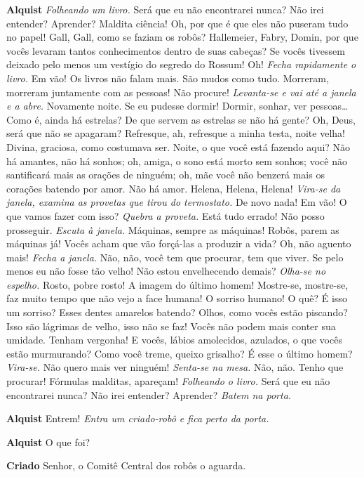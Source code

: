 \textbf{Alquist} \emph{Folheando um livro.} Será que eu não encontrarei nunca? Não irei entender?
Aprender? Maldita ciência! Oh, por que é que eles não puseram tudo no papel! 
Gall, Gall, como se faziam os robôs? Hallemeier, Fabry, Domin, por que
vocês levaram tantos conhecimentos dentro de suas cabeças? Se vocês tivessem
deixado pelo menos um vestígio do segredo do Rossum! Oh! \emph{Fecha
rapidamente o livro.} Em vão! Os livros não falam mais. São mudos como tudo.
Morreram, morreram juntamente com as pessoas! Não procure! \emph{Levanta-se e
vai até a janela e a abre.} Novamente noite. Se eu pudesse dormir! Dormir,
sonhar, ver pessoas\ldots{} Como é, ainda há estrelas? De que servem as estrelas se
não há gente? Oh, Deus, será que não se apagaram? Refresque, ah, refresque a
minha testa, noite velha! Divina, graciosa, como costumava ser. Noite, o que
você está fazendo aqui? Não há amantes, não há sonhos; oh, amiga, o sono está
morto sem sonhos; você não santificará mais as orações de ninguém; oh, mãe você
não benzerá mais os corações batendo por amor. Não há amor. Helena, Helena,
Helena! \emph{Vira-se da janela, examina as provetas que tirou do termostato.} 
De novo nada! Em vão! O que vamos fazer com isso?
\emph{Quebra a proveta.} Está tudo errado! Não posso prosseguir. 
\emph{Escuta à janela.} Máquinas, sempre as máquinas! Robôs, parem as máquinas já!
Vocês acham que vão forçá-las a produzir a vida? Oh, não aguento mais!
\emph{Fecha a janela.} Não, não, você tem que procurar, tem que viver. Se
pelo menos eu não fosse tão velho! Não estou envelhecendo demais?
\emph{Olha-se no espelho.} Rosto, pobre rosto! A imagem do último homem!
Mostre-se, mostre-se, faz muito tempo que não vejo a face humana! O sorriso
humano! O quê? É isso um sorriso? Esses dentes amarelos batendo?
Olhos, como vocês estão piscando? Isso são lágrimas de velho, isso não
se faz! Vocês não podem mais conter sua umidade. Tenham vergonha! E vocês,
lábios amolecidos, azulados, o que vocês estão murmurando? Como você treme,
queixo grisalho? É esse o último homem? \emph{Vira-se.} Não quero mais ver ninguém! 
\emph{Senta-se na mesa.} Não, não.
Tenho que procurar! Fórmulas malditas, apareçam! \emph{Folheando o livro.} Será que 
eu não encontrarei nunca? Não irei entender? Aprender?
\emph{Batem na porta.}

\textbf{Alquist} Entrem!
\emph{Entra um criado-robô e fica perto da porta.}

\textbf{Alquist} O que foi?

\textbf{Criado} Senhor, o Comitê Central dos robôs o aguarda.

